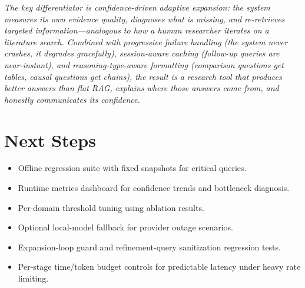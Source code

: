 \documentclass[11pt]{article}
\begin{document}
\textit{The key differentiator is confidence-driven adaptive expansion: the system measures its own evidence quality, diagnoses what is missing, and re-retrieves targeted information---analogous to how a human researcher iterates on a literature search. Combined with progressive failure handling (the system never crashes, it degrades gracefully), session-aware caching (follow-up queries are near-instant), and reasoning-type-aware formatting (comparison questions get tables, causal questions get chains), the result is a research tool that produces better answers than flat RAG, explains where those answers come from, and honestly communicates its confidence.}

\section{Next Steps}

\begin{itemize}[leftmargin=1.2em]
  \item Offline regression suite with fixed snapshots for critical queries.
  \item Runtime metrics dashboard for confidence trends and bottleneck diagnosis.
  \item Per-domain threshold tuning using ablation results.
  \item Optional local-model fallback for provider outage scenarios.
  \item Expansion-loop guard and refinement-query sanitization regression tests.
  \item Per-stage time/token budget controls for predictable latency under heavy rate limiting.
\end{itemize}
\end{document}
